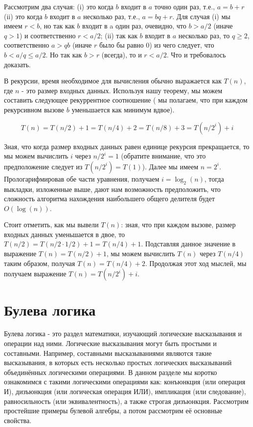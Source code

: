 Рассмотрим два случая: (i) это когда $b$ входит в $a$ точно один раз, т.е., $a = b + r$
(ii) это когда $b$ входит в $a$ несколько раз, т.е., $a = bq + r$.
Для случая (i) мы имеем $r < b$, но так как $b$ входит в a один раз, очевидно, что
$b > a/2$ (иначе $q > 1$) и соответственно $r < a/2$; (ii) так как $b$ входит в $a$ несколько раз, то $q \ge 2$,
соответственно $a > qb$ (иначе $r$ было бы равно $0$) из чего следует, 
что $b < a/q \le a/2$. Но так как $b > r$ (всегда), то и $r < a/2$. Что и требовалось доказать.

В рекурсии, время необходимое для вычисления обычно выражается как $T(n)$, где $n$ - это
размер входных данных. Используя нашу теорему, мы можем составить следующее рекуррентное соотношение (
мы полагаем, что при каждом рекурсивном вызове $b$ уменьшается как минимум вдвое).

$$T(n) = T(n/2) + 1 = 
	 T(n/4) + 2 = 
         T(n/8) + 3 = 
	 T(n/2^i) + i
$$

Зная, что когда размер входных данных равен единице рекурсия прекращается, то мы можем вычислить
$i$ через $n/2^i=1$ (обратите внимание, что это предположение следует из $T(n/2^i)=T(1)$). 
Далее мы имеем $n=2^i$. Прологарифмировав обе части уравнения, получаем
$i=\log_2(n)$, тогда выкладки, изложенные выше, дают нам возможность предположить, что сложность
алгоритма нахождения наибольшего общего делителя будет $O(\log(n))$.

Стоит отметить, как мы вывели $T(n)$: зная, что при каждом вызове, размер входных данных уменьшается в
двое, то $T(n/2) = T(n/2\cdot1/2) + 1 = T(n/4)+1$. Подставляя данное значение в выражение 
$T(n) = T(n/2) + 1$, мы можем вычислить $T(n)$ через $T(n/4)$ таким образом, получая $T(n)=T(n/4)+2$.
Продолжая этот ход мыслей, мы получаем выражение $T(n)=T(n/2^i) + i$.

\section{Булева логика}

Булева логика - это раздел математики, изучающий логические высказывания и операции над ними.
Логические высказывания могут быть простыми и составными. Например, составными высказываниями
являются такие высказывания, в которых есть несколько простых логических высказываний объединённых
логическими операциями. В данном разделе мы коротко ознакомимся с такими логическими операциями как:
конъюнкция (или операция И), дизъюнкция (или логическая операция ИЛИ), импликация (или следование),
равносильность (или эквивалентность), а также строгая дизъюнкция. Рассмотрим простейшие примеры 
булевой алгебры, а потом рассмотрим её основные свойства.

